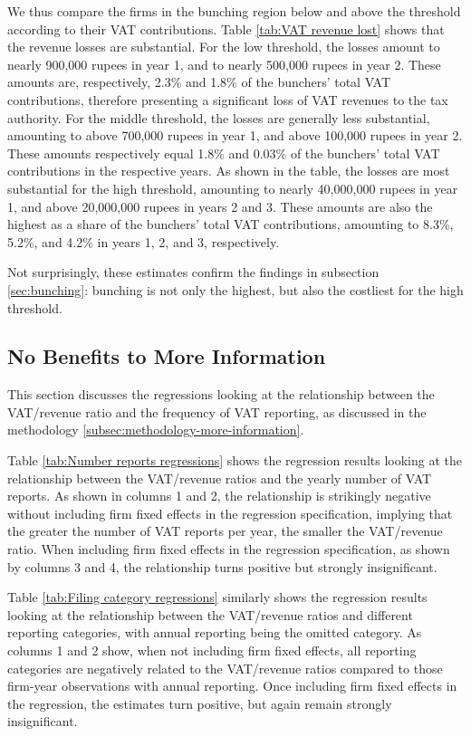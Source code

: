 We thus compare the firms in the bunching region below and above the
threshold according to their VAT contributions. Table \ref{tab:VAT revenue lost}
shows that the revenue losses are substantial. For the low threshold,
the losses amount to nearly 900,000 rupees in year 1, and to nearly
500,000 rupees in year 2. These amounts are, respectively, 2.3\% and
1.8\% of the bunchers' total VAT contributions, therefore presenting
a significant loss of VAT revenues to the tax authority. For the middle
threshold, the losses are generally less substantial, amounting to
above 700,000 rupees in year 1, and above 100,000 rupees in year 2.
These amounts respectively equal 1.8\% and 0.03\% of the bunchers'
total VAT contributions in the respective years. As shown in the table,
the losses are most substantial for the high threshold, amounting
to nearly 40,000,000 rupees in year 1, and above 20,000,000 rupees
in years 2 and 3. These amounts are also the highest as a share of
the bunchers' total VAT contributions, amounting to 8.3\%, 5.2\%,
and 4.2\% in years 1, 2, and 3, respectively.

Not surprisingly, these estimates confirm the findings in subsection
\ref{sec:bunching}: bunching is not only the highest, but also the
costliest for the high threshold.

\subsection{No Benefits to More Information}
\label{subsec:3-results-more-information}
This section discusses the regressions looking at the relationship between the VAT/revenue ratio and the frequency of VAT reporting, as discussed in the methodology \cref{subsec:methodology-more-information}.

Table \ref{tab:Number reports regressions} shows the regression results
looking at the relationship between the VAT/revenue ratios and the
yearly number of VAT reports. As shown in columns 1 and 2, the relationship
is strikingly negative without including firm fixed effects in the
regression specification, implying that the greater the number of
VAT reports per year, the smaller the VAT/revenue ratio. When including
firm fixed effects in the regression specification, as shown by columns
3 and 4, the relationship turns positive but strongly insignificant.

Table \ref{tab:Filing category regressions} similarly shows the regression
results looking at the relationship between the VAT/revenue ratios
and different reporting categories, with annual reporting being the
omitted category. As columns 1 and 2 show, when not including firm
fixed effects, all reporting categories are negatively related to
the VAT/revenue ratios compared to those firm-year observations with
annual reporting. Once including firm fixed effects in the regression,
the estimates turn positive, but again remain strongly insignificant.

